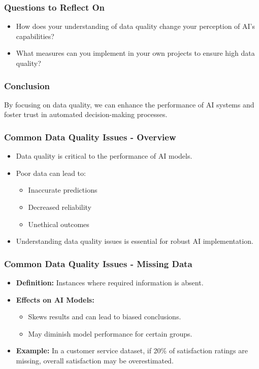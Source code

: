 \documentclass[aspectratio=169]{beamer}
\begin{document}
\begin{frame}[fragile]
    \frametitle{Questions to Reflect On}
    \begin{itemize}
        \item How does your understanding of data quality change your perception of AI's capabilities?
        \item What measures can you implement in your own projects to ensure high data quality?
    \end{itemize}
\end{frame}

\begin{frame}[fragile]
    \frametitle{Conclusion}
    By focusing on data quality, we can enhance the performance of AI systems and foster trust in automated decision-making processes.
\end{frame}

\begin{frame}[fragile]
    \frametitle{Common Data Quality Issues - Overview}
    \begin{itemize}
        \item Data quality is critical to the performance of AI models.
        \item Poor data can lead to:
        \begin{itemize}
            \item Inaccurate predictions
            \item Decreased reliability
            \item Unethical outcomes
        \end{itemize}
        \item Understanding data quality issues is essential for robust AI implementation.
    \end{itemize}
\end{frame}

\begin{frame}[fragile]
    \frametitle{Common Data Quality Issues - Missing Data}
    \begin{itemize}
        \item \textbf{Definition:} Instances where required information is absent.
        \item \textbf{Effects on AI Models:}
        \begin{itemize}
            \item Skews results and can lead to biased conclusions.
            \item May diminish model performance for certain groups.
        \end{itemize}
        \item \textbf{Example:} In a customer service dataset, if 20\% of satisfaction ratings are missing, overall satisfaction may be overestimated.
    \end{itemize}
\end{frame}
\end{document}
